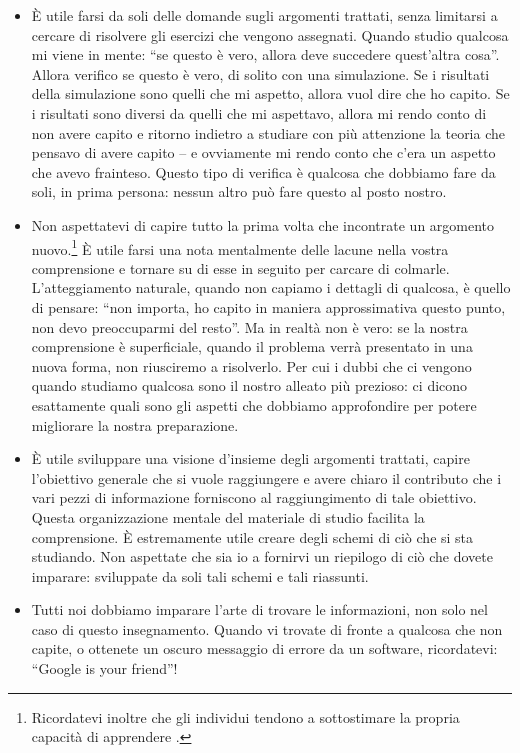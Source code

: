 \documentclass[
  11pt,
]{krantz}
\theoremstyle{definition}
\theoremstyle{definition}
\theoremstyle{definition}
\theoremstyle{definition}
\theoremstyle{remark}
\begin{document}
\begin{itemize}
\item
  È utile farsi da soli delle domande sugli argomenti trattati, senza limitarsi a cercare di risolvere gli esercizi che vengono assegnati. Quando studio qualcosa mi viene in mente: ``se questo è vero, allora deve succedere quest'altra cosa''. Allora verifico se questo è vero, di solito con una simulazione. Se i risultati della simulazione sono quelli che mi aspetto, allora vuol dire che ho capito. Se i risultati sono diversi da quelli che mi aspettavo, allora mi rendo conto di non avere capito e ritorno indietro a studiare con più attenzione la teoria che pensavo di avere capito -- e ovviamente mi rendo conto che c'era un aspetto che avevo frainteso. Questo tipo di verifica è qualcosa che dobbiamo fare da soli, in prima persona: nessun altro può fare questo al posto nostro.
\item
  Non aspettatevi di capire tutto la prima volta che incontrate un argomento nuovo.\footnote{Ricordatevi inoltre che gli individui tendono a sottostimare la propria capacità di apprendere \citep{horn2021underestimating}.} È utile farsi una nota mentalmente delle lacune nella vostra comprensione e tornare su di esse in seguito per carcare di colmarle. L'atteggiamento naturale, quando non capiamo i dettagli di qualcosa, è quello di pensare: ``non importa, ho capito in maniera approssimativa questo punto, non devo preoccuparmi del resto''. Ma in realtà non è vero: se la nostra comprensione è superficiale, quando il problema verrà presentato in una nuova forma, non riusciremo a risolverlo. Per cui i dubbi che ci vengono quando studiamo qualcosa sono il nostro alleato più prezioso: ci dicono esattamente quali sono gli aspetti che dobbiamo approfondire per potere migliorare la nostra preparazione.
\item
  È utile sviluppare una visione d'insieme degli argomenti trattati, capire l'obiettivo generale che si vuole raggiungere e avere chiaro il contributo che i vari pezzi di informazione forniscono al raggiungimento di tale obiettivo. Questa organizzazione mentale del materiale di studio facilita la comprensione. È estremamente utile creare degli schemi di ciò che si sta studiando. Non aspettate che sia io a fornirvi un riepilogo di ciò che dovete imparare: sviluppate da soli tali schemi e tali riassunti.
\item
  Tutti noi dobbiamo imparare l'arte di trovare le informazioni, non solo nel caso di questo insegnamento. Quando vi trovate di fronte a qualcosa che non capite, o ottenete un oscuro messaggio di errore da un software, ricordatevi: ``Google is your friend''!
\end{itemize}
\end{document}
